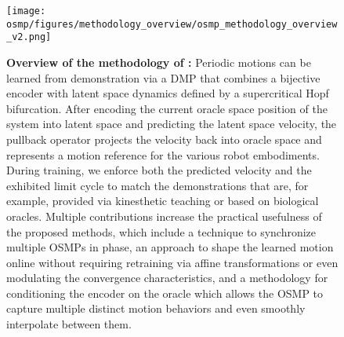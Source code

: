 \begin{figure}[h]
    \centering
    \texttt{[image: osmp/figures/methodology\_overview/osmp\_methodology\_overview\_v2.png]}
    \caption{
    \textbf{Overview of the methodology of :}
    Periodic motions can be learned from demonstration via a \gls{DMP} that combines a bijective encoder with latent space dynamics defined by a supercritical Hopf bifurcation. After encoding the current oracle space position of the system into latent space and predicting the latent space velocity, the pullback operator projects the velocity back into oracle space and represents a motion reference for the various robot embodiments. During training, we enforce both the predicted velocity and the exhibited limit cycle to match the demonstrations that are, for example, provided via kinesthetic teaching or based on biological oracles.
    Multiple contributions increase the practical usefulness of the proposed methods, which include a technique to synchronize multiple \glspl{OSMP} in phase, an approach to shape the learned motion online without requiring retraining via affine transformations or even modulating the convergence characteristics, and a methodology for conditioning the encoder on the oracle which allows the \gls{OSMP} to capture multiple distinct motion behaviors and even smoothly interpolate between them.
    }
    \label{fig:osmp:methodology_overview}
\end{figure}
